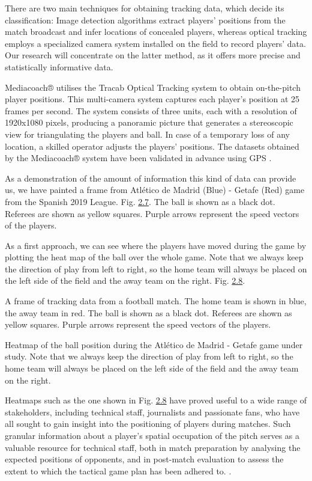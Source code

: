\documentclass[twoside,nohyper]{tufte-book}
\begin{document}
There are two main techniques for obtaining tracking data, which decide
its classification: Image detection algorithms extract players'
positions from the match broadcast and infer locations of concealed
players, whereas optical tracking employs a specialized camera system
installed on the field to record players' data. Our research will
concentrate on the latter method, as it offers more precise and
statistically informative data.

Mediacoach® utilises the Tracab Optical Tracking system to obtain
on-the-pitch player positions. This multi-camera system captures each
player's position at 25 frames per second. The system consists of three
units, each with a resolution of 1920x1080 pixels, producing a panoramic
picture that generates a stereoscopic view for triangulating the players
and ball. In case of a temporary loss of any location, a skilled
operator adjusts the players' positions. The datasets obtained by the
Mediacoach® system have been validated in advance using GPS
\citep{Felipe2019ValidationOA}.

As a demonstration of the amount of information this kind of data can
provide us, we have painted a frame from Atlético de Madrid (Blue) -
Getafe (Red) game from the Spanish 2019 League. Fig.
\protect\hyperlink{f2.7}{2.7}. The ball is shown
as a black dot. Referees are shown as yellow squares. Purple arrows
represent the speed vectors of the players.

As a first approach, we can see where the players have moved during the
game by plotting the heat map of the ball over the whole game. Note that
we always keep the direction of play from left to right, so the home
team will always be placed on the left side of the field and the away
team on the right. Fig. \protect\hyperlink{f2.8}{2.8}.

A frame of tracking data from a football match. The home
team is shown in blue, the away team in red. The ball is shown as a
black dot. Referees are shown as yellow squares. Purple arrows represent
the speed vectors of the players.

Heatmap of the ball position during the Atlético de Madrid -
Getafe game under study. Note that we always keep the direction of play
from left to right, so the home team will always be placed on the left
side of the field and the away team on the right.

Heatmaps such as the one shown in Fig. \protect\hyperlink{f2.8}{2.8} have proved useful to a wide range of stakeholders,
including technical staff, journalists and passionate fans, who have all
sought to gain insight into the positioning of players during matches.
Such granular information about a player's spatial occupation of the
pitch serves as a valuable resource for technical staff, both in match
preparation by analysing the expected positions of opponents, and in
post-match evaluation to assess the extent to which the tactical game
plan has been adhered to. \citep{Garrido_2022}.
\end{document}

